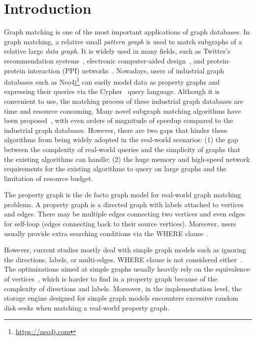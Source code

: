 \section{Introduction}
Graph matching
is one of the most important applications of graph databases. In graph matching, a relative small \emph{pattern graph} is used to match subgraphs of a relative large \emph{data graph}.
It is widely used in many fields,
such as Twitter's recommendation systems~\cite{DBLP:journals/pvldb/GuptaSGGZLL14,DBLP:journals/pvldb/SharmaJBLL16},
electronic computer-aided design~\cite{DBLP:conf/dac/OhlrichEGS93},
and protein-protein interaction (PPI) networks~\cite{milenkovic2008uncovering}.
Nowadays, users of industrial graph databases such as Neo4j\footnote{\url{https://neo4j.com}}
can easily model data as property graphs and expressing their queries via the Cypher~\cite{DBLP:conf/sigmod/FrancisGGLLMPRS18,DBLP:journals/pvldb/SahuMSLO17} query language.
Although it is convenient to use, the matching process of these industrial graph databases are time and resource consuming.
Many novel subgraph matching algorithms have been proposed~\cite{DBLP:journals/pvldb/SunWWSL12,DBLP:conf/sigmod/HanLL13,DBLP:conf/sigmod/ShaoCCMYX14,DBLP:conf/cloud/SerafiniMS17,DBLP:journals/pvldb/QiaoZC17,DBLP:conf/sigmod/DiasTGM019}, with even orders of magnitude of speedup compared to the industrial graph databases.
However, there are two gaps that hinder these algorithms from being widely adopted in the real-world scenarios:
(1) the gap between the complexity of real-world queries and the simplicity of graphs that the existing algorithms can handle;
(2) the huge memory and high-speed network requirements for the existing algorithms to query on large graphs and the limitation of resource budget.

The property graph is the de facto graph model for real-world graph matching problems.
A property graph is a directed graph with labels attached to vertices and edges.
There may be multiple edges connecting two vertices and even edges for self-loop (edges connecting back to their source vertices).
Moreover, users usually provide extra searching conditions via the WHERE clause~\cite{DBLP:journals/csur/AnglesABHRV17}.

However,  current studies mostly deal with simple graph models such as ignoring the directions, labels, or multi-edges. WHERE clause is not considered either~\cite{DBLP:journals/pvldb/SunWWSL12,DBLP:conf/sigmod/HanLL13,DBLP:conf/sigmod/KimLBHLKJ16,DBLP:journals/pvldb/QiaoZC17,DBLP:journals/pvldb/MhedhbiS19}. The optimizations aimed at simple graphs usually heavily rely on the equivalence of vertices~\cite{DBLP:conf/sigmod/HanLL13,DBLP:journals/pvldb/QiaoZC17}, which is harder to find in a property graph because of the complexity of directions and labels. Moreover, in the implementation level, the storage engine designed for simple graph models encounters excessive random disk seeks when matching a real-world property graph.

